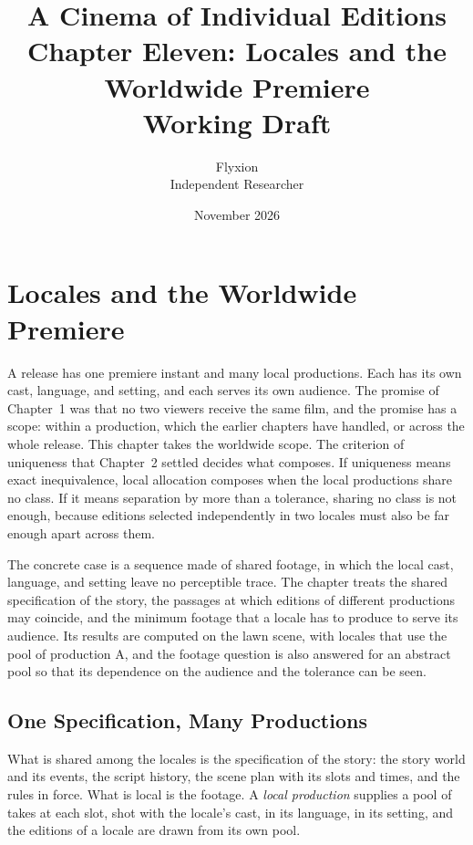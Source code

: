 \documentclass[11pt,twoside,openright]{book}
\title{\Huge\bfseries A Cinema of Individual Editions\\[1.2ex]
\large Chapter Eleven: Locales and the Worldwide Premiere\\[0.4ex]
\large Working Draft}
\author{Flyxion\\[0.3ex]\small Independent Researcher}
\date{November 2026}
\theoremstyle{plain}
\theoremstyle{definition}
\theoremstyle{remark}
\begin{document}
\frontmatter
\maketitle
\tableofcontents
\mainmatter
\setcounter{chapter}{10}

\chapter{Locales and the Worldwide Premiere}
\label{ch:locales}

A release has one premiere instant and many local productions. Each has its own cast, language, and setting, and each serves its own audience. The promise of Chapter~1 was that no two viewers receive the same film, and the promise has a scope: within a production, which the earlier chapters have handled, or across the whole release. This chapter takes the worldwide scope. The criterion of uniqueness that Chapter~2 settled decides what composes. If uniqueness means exact inequivalence, local allocation composes when the local productions share no class. If it means separation by more than a tolerance, sharing no class is not enough, because editions selected independently in two locales must also be far enough apart across them.

The concrete case is a sequence made of shared footage, in which the local cast, language, and setting leave no perceptible trace. The chapter treats the shared specification of the story, the passages at which editions of different productions may coincide, and the minimum footage that a locale has to produce to serve its audience. Its results are computed on the lawn scene, with locales that use the pool of production A, and the footage question is also answered for an abstract pool so that its dependence on the audience and the tolerance can be seen.

\section{One Specification, Many Productions}\label{sec:spec}

What is shared among the locales is the specification of the story: the story world and its events, the script history, the scene plan with its slots and times, and the rules in force. What is local is the footage. A \emph{local production} supplies a pool of takes at each slot, shot with the locale's cast, in its language, in its setting, and the editions of a locale are drawn from its own pool.
\end{document}
